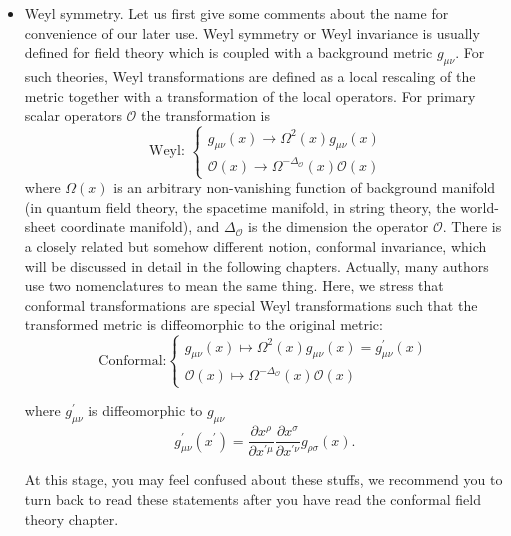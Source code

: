 \documentclass[graybox,envcountchap,sectrefs]{svmono}
\begin{document}
\begin{itemize}
\item Weyl symmetry. Let us first give some comments about the name
for convenience of our later use.
Weyl symmetry or Weyl invariance is usually defined for field theory which is coupled with a background metric $g_{\mu\nu}$.
For such theories, Weyl transformations are defined as a local rescaling of the metric together with a transformation of the local operators. For primary scalar operators $\mathcal{O}$ the transformation is
\begin{equation}
\text { Weyl: } 
\begin{cases}
 g_{\mu \nu}(x) \to \Omega^{2}(x) g_{\mu \nu}(x) \\
\mathcal{O}(x)  \to \Omega^{-\Delta_{\mathcal{O}}}(x) \mathcal{O}(x)
\end{cases}
\end{equation}
where $\Omega(x)$ is an arbitrary non-vanishing function of background manifold (in quantum field theory, the spacetime manifold, in string theory, the world-sheet coordinate manifold), and $\Delta_{\mathcal{O}}$ is the dimension the operator $\mathcal{O}$.
There is a closely related but somehow different notion, conformal invariance, which will be discussed in detail in the following chapters.
Actually, many authors use two nomenclatures to mean the same thing. Here, we stress that conformal transformations are special Weyl transformations such that the transformed metric is diffeomorphic to the original metric:
\begin{equation}
\text{Conformal:}	
\begin{cases}
g_{\mu \nu}(x)  \mapsto \Omega^{2}(x) g_{\mu \nu}(x)=g_{\mu \nu}^{\prime}(x) \\
\mathcal{O}(x) \mapsto \Omega^{-\Delta_{\mathcal{O}}}(x) \mathcal{O}(x)
\end{cases}
\end{equation}

where $g_{\mu \nu}^{\prime}$ is diffeomorphic to $g_{\mu \nu}$
\begin{equation}
g_{\mu \nu}^{\prime}\left(x^{\prime}\right)=\frac{\partial x^{\rho}}{\partial x^{\prime \mu}} \frac{\partial x^{\sigma}}{\partial x^{\prime \nu}} g_{\rho \sigma}(x).
\end{equation}

At this stage, you may feel confused about these stuffs, we recommend you to turn back to read these statements after you have read the conformal field theory chapter. 


\end{itemize}
\end{document}
